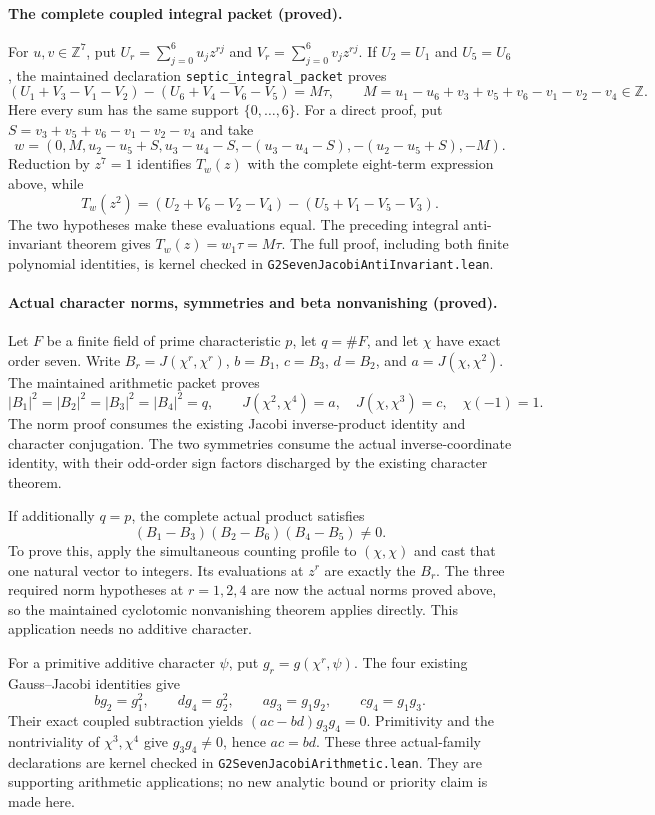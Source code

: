 \documentclass[11pt]{article}
\begin{document}
\paragraph{The complete coupled integral packet (proved).}
For \(u,v\in\mathbb Z^7\), put
\(U_r=\sum_{j=0}^6u_jz^{rj}\) and
\(V_r=\sum_{j=0}^6v_jz^{rj}\).
If \(U_2=U_1\) and \(U_5=U_6\), the maintained declaration
\texttt{septic\_integral\_packet} proves
\[
 (U_1+V_3-V_1-V_2)-(U_6+V_4-V_6-V_5)=M\tau,
 \qquad
 M=u_1-u_6+v_3+v_5+v_6-v_1-v_2-v_4\in\mathbb Z.
\]
Here every sum has the same support \(\{0,\ldots,6\}\).
For a direct proof, put \(S=v_3+v_5+v_6-v_1-v_2-v_4\) and take
\[
 w=(0,M,u_2-u_5+S,u_3-u_4-S,
       -(u_3-u_4-S),-(u_2-u_5+S),-M).
\]
Reduction by \(z^7=1\) identifies \(T_w(z)\) with the complete
eight-term expression above, while
\[
 T_w(z^2)=(U_2+V_6-V_2-V_4)-(U_5+V_1-V_5-V_3).
\]
The two hypotheses make these evaluations equal. The preceding
integral anti-invariant theorem gives \(T_w(z)=w_1\tau=M\tau\).
The full proof, including both finite polynomial identities, is
kernel checked in \texttt{G2SevenJacobiAntiInvariant.lean}.

\paragraph{Actual character norms, symmetries and beta nonvanishing (proved).}
Let \(F\) be a finite field of prime characteristic \(p\), let
\(q=\#F\), and let \(\chi\) have exact order seven. Write
\(B_r=J(\chi^r,\chi^r)\), \(b=B_1\), \(c=B_3\), \(d=B_2\), and
\(a=J(\chi,\chi^2)\). The maintained arithmetic packet proves
\[
 |B_1|^2=|B_2|^2=|B_3|^2=|B_4|^2=q,\qquad
 J(\chi^2,\chi^4)=a,\quad J(\chi,\chi^3)=c,\quad \chi(-1)=1.
\]
The norm proof consumes the existing Jacobi inverse-product identity
and character conjugation. The two symmetries consume the actual
inverse-coordinate identity, with their odd-order sign factors
discharged by the existing character theorem.

If additionally \(q=p\), the complete actual product satisfies
\[
 (B_1-B_3)(B_2-B_6)(B_4-B_5)\ne0.
\]
To prove this, apply the simultaneous counting profile to \((\chi,\chi)\)
and cast that one natural vector to integers. Its evaluations at
\(z^r\) are exactly the \(B_r\). The three required norm hypotheses
at \(r=1,2,4\) are now the actual norms proved above, so the
maintained cyclotomic nonvanishing theorem applies directly.
This application needs no additive character.

For a primitive additive character \(\psi\), put \(g_r=g(\chi^r,\psi)\).
The four existing Gauss--Jacobi identities give
\[
 bg_2=g_1^2,\qquad dg_4=g_2^2,\qquad
 ag_3=g_1g_2,\qquad cg_4=g_1g_3.
\]
Their exact coupled subtraction yields
\((ac-bd)g_3g_4=0\). Primitivity and the nontriviality of
\(\chi^3,\chi^4\) give \(g_3g_4\ne0\), hence \(ac=bd\).
These three actual-family declarations are kernel checked in
\texttt{G2SevenJacobiArithmetic.lean}. They are supporting arithmetic
applications; no new analytic bound or priority claim is made here.
\end{document}
